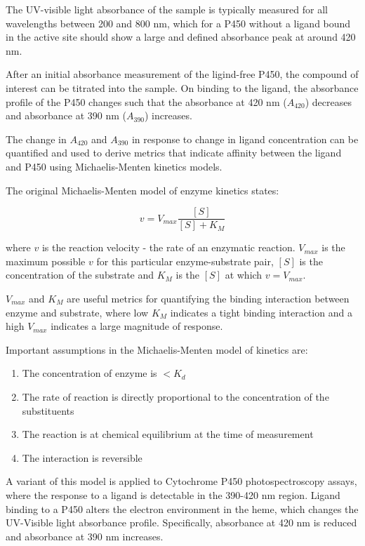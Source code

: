 \documentclass{article}
\begin{document}
The UV-visible light absorbance of the sample is typically measured for all wavelengths between 200 and 800 nm, which for a P450 without a ligand bound in the active site should show a large and defined absorbance peak at around 420 nm.
\par
After an initial absorbance measurement of the ligind-free P450, the compound of interest can be titrated into the sample.
On binding to the ligand, the absorbance profile of the P450 changes such that the absorbance at 420 nm ($A_{420}$) decreases and absorbance at 390 nm ($A_{390}$) increases.
\par
The change in $A_{420}$ and $A_{390}$ in response to change in ligand concentration can be quantified and used to derive metrics that indicate affinity between the ligand and P450 using Michaelis-Menten kinetics models.
\par
The original Michaelis-Menten model of enzyme kinetics states:

\begin{equation}
	v = V_{max} \frac{[S]}{[S] + K_M} 
\end{equation}

where $v$ is the reaction velocity - the rate of an enzymatic reaction. 
$V_{max}$ is the maximum possible $v$ for this particular enzyme-substrate pair, $[S]$ is the concentration of the substrate and $K_M$ is the $[S]$ at which $v = V_{max}$.
\par
$V_{max}$ and $K_M$ are useful metrics for quantifying the binding interaction between enzyme and substrate, where low $K_M$ indicates a tight binding interaction and a high $V_{max}$ indicates a large magnitude of response.

Important assumptions in the Michaelis-Menten model of kinetics are:

\begin{enumerate}
	\item The concentration of enzyme is $< K_d$ 
	\item The rate of reaction is directly proportional to the concentration of the substituents
	\item The reaction is at chemical equilibrium at the time of measurement
	\item The interaction is reversible
\end{enumerate}

A variant of this model is applied to Cytochrome P450 photospectroscopy assays, where the response to a ligand is detectable in the 390-420 nm region.
Ligand binding to a P450 alters the electron environment in the heme, which changes the UV-Visible light absorbance profile.
Specifically, absorbance at 420 nm is reduced and absorbance at 390 nm increases.
\end{document}
